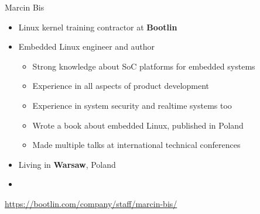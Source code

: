\begin{frame}{Marcin Bis}
    \begin{itemize}
      \item Linux kernel training contractor at {\bf Bootlin}
      \item Embedded Linux engineer and author
        \begin{itemize}
	  \item Strong knowledge about SoC platforms for embedded systems
	  \item Experience in all aspects of product development
	  \item Experience in system security and realtime systems too
	  \item Wrote a book about embedded Linux, published in Poland
	  \item Made multiple talks at international technical conferences
        \end{itemize}
      \item Living in {\bf Warsaw}, Poland
      \item {}
    \end{itemize}
    {\small \url{https://bootlin.com/company/staff/marcin-bis/}}
\end{frame}

